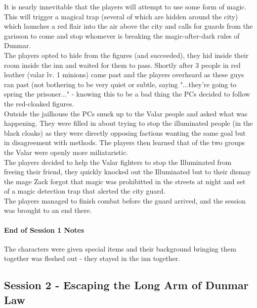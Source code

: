 \documentclass[10pt,twoside,twocolumn]{article}
\begin{document}
It is nearly innevitable that the players will attempt to use some form of magic. This will trigger a magical trap (several of which are hidden around the city) which launches a red flair into the air above the city and calls for guards from the garisson to come and stop whomever is breaking the magic-after-dark rules of Dunmar. \\

The players opted to hide from the figures (and succeeded), they hid inside their room inside the inn and waited for them to pass. Shortly after 3 people in red leather (valar lv. 1 minions) came past and the players overheard as these guys ran past (not bothering to be very quiet or subtle, saying "...they're going to spring the prisoner..." - knowing this to be a bad thing the PCs decided to follow the red-cloaked figures. \\

Outside the jailhouse the PCs snuck up to the Valar people and asked what was happening. They were filled in about trying to stop the illuminated people (in the black cloaks) as they were directly opposing factions wanting the same goal but in disagreement with methods. The players then learned that of the two groups the Valar were openly more miliataristic. \\

The players decided to help the Valar fighters to stop the Illuminated from freeing their friend, they quickly knocked out the Illuminated but to their dismay the mage Zack forgot that magic was prohibitted in the streets at night and set of a magic detection trap that alerted the city guard. \\

The players managed to finish combat before the guard arrived, and the session was brought to an end there.

\paragraph{End of Session 1 Notes}
The characters were given special items and their background bringing them together was fleshed out - they stayed in the inn together. \\

\subsection{Session 2 - Escaping the Long Arm of Dunmar Law}

\end{document}
